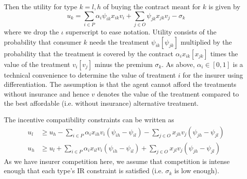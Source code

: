 \documentclass[a4paper,12pt]{article}
\begin{document}
Then the utility for type \(k=l,h\) of buying the contract meant for \(k\) is given by
\begin{equation}
\label{eq:11}
u_k = \sum_{i \in P} \alpha_i \psi_{ik} x_{ik} v_i + \sum_{j \in O} \psi_{jk} x_{jk} v_j - \sigma_k
\end{equation}
where we drop the \(\iota\) superscript to ease notation. Utility consists of the probability that consumer \(k\) needs the treatment \(\psi_{ik} [\psi_{jk}]\) multiplied by the probability that the treatment is covered by the contract \(\alpha_i x_{ik} [x_{jk}]\) times the value of the treatment \(v_i [v_j]\) minus the premium \(\sigma_k\). As above, \(\alpha_i \in [0,1]\) is a technical convenience to determine the value of treatment \(i\) for the insurer using differentiation. The assumption is that the agent cannot afford the treatments without insurance and hence \(v\) denotes the value of the treatment compared to the best affordable (i.e. without insurance) alternative treatment.

The incentive compatibility constraints can be written as
\begin{align}
\label{eq:12} \tag{$IC_l$}
u_l &\geq  u_h - \sum_{i \in P} \alpha_i x_{ih} v_i (\psi_{ih}-\psi_{il}) - \sum_{j \in O} x_{jh} v_j (\psi_{jh}-\psi_{jl})  \\
\label{eq:12a} \tag{$IC_h$}
u_h &\geq  u_l + \sum_{i \in P} \alpha_i x_{il} v_i (\psi_{ih}-\psi_{il}) + \sum_{j \in O} x_{jl} v_j (\psi_{jh}-\psi_{jl})
\end{align}
As we have insurer competition here, we assume that competition is intense enough that each type's IR constraint is satisfied (i.e. \(\sigma_k\) is low enough).
\end{document}
